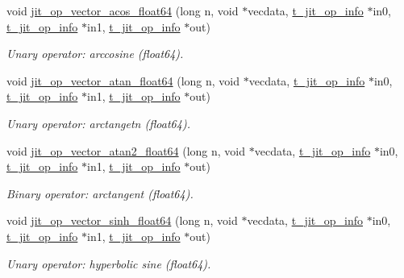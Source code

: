 \begin{DoxyCompactItemize}
void \hyperlink{group__opvecmod_ga46d0ebc25d8e255f31926e84e358f5c5}{jit\_\-op\_\-vector\_\-acos\_\-float64} (long n, void $\ast$vecdata, \hyperlink{structt__jit__op__info}{t\_\-jit\_\-op\_\-info} $\ast$in0, \hyperlink{structt__jit__op__info}{t\_\-jit\_\-op\_\-info} $\ast$in1, \hyperlink{structt__jit__op__info}{t\_\-jit\_\-op\_\-info} $\ast$out)
\begin{DoxyCompactList}\small\item\em Unary operator: arccosine (float64). \item\end{DoxyCompactList}\item 
void \hyperlink{group__opvecmod_ga6b9d8110037905bd2f5be2634bcee094}{jit\_\-op\_\-vector\_\-atan\_\-float64} (long n, void $\ast$vecdata, \hyperlink{structt__jit__op__info}{t\_\-jit\_\-op\_\-info} $\ast$in0, \hyperlink{structt__jit__op__info}{t\_\-jit\_\-op\_\-info} $\ast$in1, \hyperlink{structt__jit__op__info}{t\_\-jit\_\-op\_\-info} $\ast$out)
\begin{DoxyCompactList}\small\item\em Unary operator: arctangetn (float64). \item\end{DoxyCompactList}\item 
void \hyperlink{group__opvecmod_gaf9a440ed08661ff416fa1339e333b468}{jit\_\-op\_\-vector\_\-atan2\_\-float64} (long n, void $\ast$vecdata, \hyperlink{structt__jit__op__info}{t\_\-jit\_\-op\_\-info} $\ast$in0, \hyperlink{structt__jit__op__info}{t\_\-jit\_\-op\_\-info} $\ast$in1, \hyperlink{structt__jit__op__info}{t\_\-jit\_\-op\_\-info} $\ast$out)
\begin{DoxyCompactList}\small\item\em Binary operator: arctangent (float64). \item\end{DoxyCompactList}\item 
void \hyperlink{group__opvecmod_ga7e20091f22eff18d921e3bba2ac20ece}{jit\_\-op\_\-vector\_\-sinh\_\-float64} (long n, void $\ast$vecdata, \hyperlink{structt__jit__op__info}{t\_\-jit\_\-op\_\-info} $\ast$in0, \hyperlink{structt__jit__op__info}{t\_\-jit\_\-op\_\-info} $\ast$in1, \hyperlink{structt__jit__op__info}{t\_\-jit\_\-op\_\-info} $\ast$out)
\begin{DoxyCompactList}\small\item\em Unary operator: hyperbolic sine (float64). \item\end{DoxyCompactList}\item 

\end{DoxyCompactItemize}
